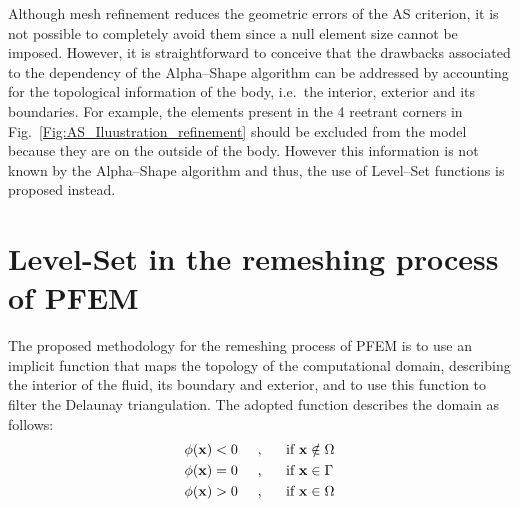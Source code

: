 \documentclass[final,3p,times]{elsarticle}
\begin{document}
Although mesh refinement reduces the geometric errors of the AS criterion, it is not possible to completely avoid them since a null element size cannot be imposed. However, it is straightforward to conceive that the drawbacks associated to the dependency of the Alpha--Shape algorithm can be addressed by accounting for the topological information of the body, i.e.~the interior, exterior and its boundaries. For example, the elements present in the 4 reetrant corners in Fig.~\ref{Fig:AS_Iluustration_refinement} should be excluded from the model because they are on the outside of the body. However this information is not known by the Alpha--Shape algorithm and thus, the use of Level--Set functions is proposed instead.



\section{Level-Set in the remeshing process of PFEM}\label{sec:PFEM-LS}

The proposed methodology for the remeshing process of PFEM is to use an implicit function that maps the topology of the computational domain, describing the interior of the fluid, its boundary and exterior, and to use this function to filter the Delaunay triangulation. The adopted function describes the domain as follows:
%
\begin{subequations}
\begin{align}
\phi(\mathbf{x}) < 0 & \text{\hspace{5mm},\hspace{5mm} if $\mathbf{x} \notin \Omega $}
\\
\phi(\mathbf{x}) = 0 & \text{\hspace{5mm},\hspace{5mm} if $\mathbf{x} \in \Gamma $}
\\
\phi(\mathbf{x}) > 0 & \text{\hspace{5mm},\hspace{5mm} if $\mathbf{x} \in \Omega $}
\end{align}
\end{subequations}
\end{document}
